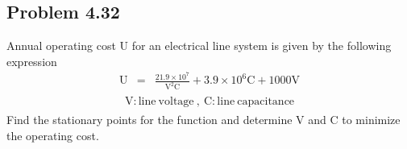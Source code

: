 \documentclass[]{report}
\begin{document}
\subsection*{Problem 4.32}
Annual operating cost U for an electrical line system is given by the following expression
\begin{eqnarray}
\mathrm U&=&\frac{21.9\times 10^7}{\mathrm V^2 \mathrm C}+3.9\times 10^6 \mathrm C+1000 \mathrm V 
\end{eqnarray}
\begin{eqnarray*}
\begin{array}{l}
\mathrm{V:line \ voltage}\ ,\ \mathrm{C:line \ capacitance}
\end{array}
\end{eqnarray*}
Find the stationary points for the function and determine V and C to minimize the operating cost.
\end{document}
